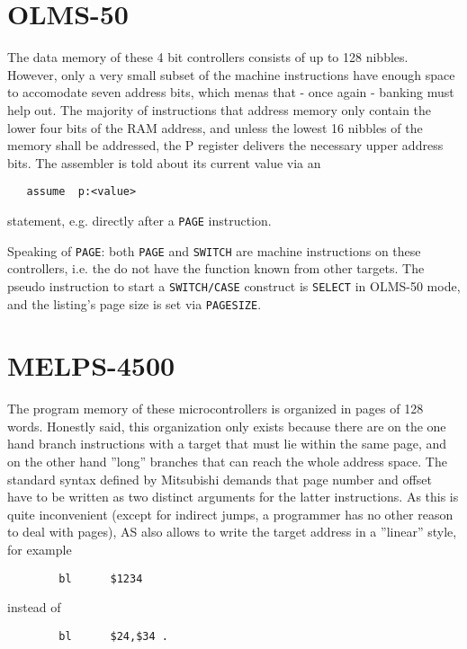 \documentclass[12pt,twoside]{report}
\newcommand{\tty}[1]{{\tt #1}}
\newcommand{\asname}{{AS}}
\begin{document}

\section{OLMS-50}

The data memory of these 4 bit controllers consists of up to 128
nibbles.  However, only a very small subset of the machine
instructions have enough space to accomodate seven address bits,
which menas that - once again - banking must help out.  The
majority of instructions that address memory only contain the
lower four bits of the RAM address, and unless the lowest 16
nibbles of the memory shall be addressed, the P register delivers
the necessary upper address bits. The assembler is told about its
current value via an
\begin{verbatim}
   assume  p:<value>
\end{verbatim}
statement, e.g. directly after a \tty{PAGE} instruction.

Speaking of \tty{PAGE}: both \tty{PAGE} and \tty{SWITCH} are
machine instructions on these controllers, i.e. the do not have
the function known from other targets.  The pseudo instruction to
start a \tty{SWITCH/CASE} construct is \tty{SELECT} in OLMS-50
mode, and the listing's page size is set via \tty{PAGESIZE}.


\section{MELPS-4500}

The program memory of these microcontrollers is organized in pages of
128 words.  Honestly said, this organization only exists because there
are on the one hand branch instructions with a target that must lie
within the same page, and on the other hand ''long'' branches that can
reach the whole address space.  The standard syntax defined by
Mitsubishi demands that page number and offset have to be written as
two distinct arguments for the latter instructions.  As this is
quite inconvenient (except for indirect jumps, a programmer has no
other reason to deal with pages), \asname{} also allows to write the target
address in a ''linear'' style, for example
\begin{verbatim}
        bl      $1234
\end{verbatim}
instead of
\begin{verbatim}
        bl      $24,$34 .
\end{verbatim}
\end{document}
